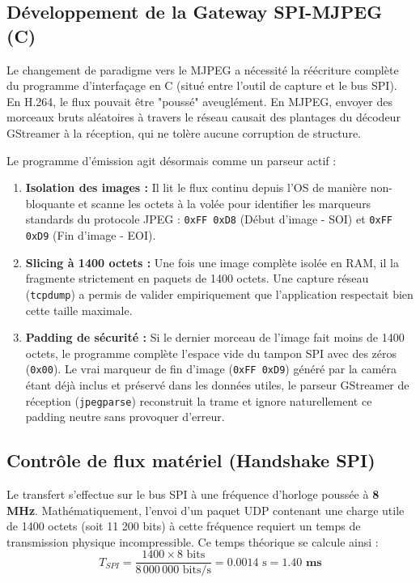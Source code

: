 \newpage

\subsection{Développement de la Gateway SPI-MJPEG (C)}
Le changement de paradigme vers le MJPEG a nécessité la réécriture complète du programme d'interfaçage en 
C (situé entre l'outil de capture et le bus SPI). En H.264, le flux pouvait être "poussé" aveuglément. En 
MJPEG, envoyer des morceaux bruts aléatoires à travers le réseau causait des plantages du décodeur 
GStreamer à la réception, qui ne tolère aucune corruption de structure.

Le programme d'émission agit désormais comme un parseur actif :
\begin{enumerate}
    \item \textbf{Isolation des images :} Il lit le flux continu depuis l'OS de manière non-bloquante et 
    scanne les octets à la volée pour identifier les marqueurs standards du protocole JPEG : 
    \texttt{0xFF 0xD8} (Début d'image - SOI) et \texttt{0xFF 0xD9} (Fin d'image - EOI).
    \item \textbf{Slicing à 1400 octets :} Une fois une image complète isolée en RAM, il la fragmente 
    strictement en paquets de 1400 octets. Une capture réseau (\texttt{tcpdump}) a permis de valider 
    empiriquement que l'application respectait bien cette taille maximale.
    \item \textbf{Padding de sécurité :} Si le dernier morceau de l'image fait moins de 1400 octets, 
    le programme complète l'espace vide du tampon SPI avec des zéros (\texttt{0x00}). Le vrai marqueur 
    de fin d'image (\texttt{0xFF 0xD9}) généré par la caméra étant déjà inclus et préservé dans les 
    données utiles, le parseur GStreamer de réception (\texttt{jpegparse}) reconstruit la trame et ignore 
    naturellement ce padding neutre sans provoquer d'erreur.
\end{enumerate}

\subsection{Contrôle de flux matériel (Handshake SPI)}
Le transfert s'effectue sur le bus SPI à une fréquence d'horloge poussée à \textbf{8 MHz}. Mathématiquement, 
l'envoi d'un paquet UDP contenant une charge utile de 1400 octets (soit 11 200 bits) à cette fréquence requiert 
un temps de transmission physique incompressible. Ce temps théorique se calcule ainsi :
$$T_{SPI} = \frac{1400 \times 8\text{ bits}}{8\,000\,000\text{ bits/s}} = 0.0014\text{ s} = \mathbf{1.40\text{ ms}}$$

